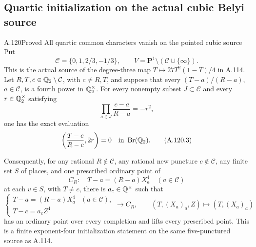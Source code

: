 \subsection{Quartic initialization on the actual cubic Belyi source}

\begin{statement}{A.120}{Proved}
{All quartic common characters vanish on the pointed cubic source}
Put
\[
       \mathcal C=\{0,1,2/3,-1/3\},\qquad
       V=\mathbf P^1\setminus(\mathcal C\cup\{\infty\}).
\tag{A.120.1}
\]
This is the actual source of the degree-three map
$T\mapsto27T^2(1-T)/4$ in A.114.
Let $R,T,c\in\mathbb Q_2\setminus\mathcal C$, with $c\ne R,T$,
and suppose that every $(T-a)/(R-a)$, $a\in\mathcal C$,
is a fourth power in $\mathbb Q_2^\times$.
For every nonempty subset $J\subset\mathcal C$ and every
$r\in\mathbb Q_2^\times$ satisfying
\[
                 \prod_{a\in J}\frac{c-a}{R-a}=-r^2,
\tag{A.120.2}
\]
one has the exact evaluation
\[
                \left(\frac{T-c}{R-c},2r\right)=0
                                \quad\hbox{in }\operatorname{Br}(\mathbb Q_2).
\tag{A.120.3}
\]

Consequently, for any rational $R\notin\mathcal C$, any
rational new puncture $c\notin\mathcal C$, any finite set
$S$ of places, and one prescribed ordinary point of
\[
             C_R:\quad T-a=(R-a)X_a^4
                               \quad(a\in\mathcal C)
\tag{A.120.4}
\]
at each $v\in S$, with $T\ne c$, there is
$a_c\in\mathbb Q^\times$ such that
\[
 \left\{
 \begin{array}{ll}
 T-a=(R-a)X_a^4 &(a\in\mathcal C),\\
 T-c=a_c Z^4&
 \end{array}\right.
       \longrightarrow C_R,\qquad
       (T,(X_a)_a,Z)\longmapsto(T,(X_a)_a)
\tag{A.120.5}
\]
has an ordinary point over every completion and lifts
every prescribed point.
This is a finite exponent-four initialization statement
on the same five-punctured source as A.114.
\end{statement}
